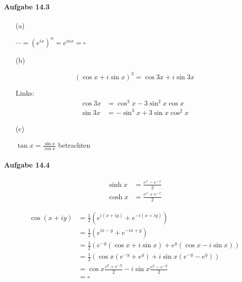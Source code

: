 \paragraph{Aufgabe 14.3}

\begin{enumerate}

\item[(a)]

$\cdots=(e^{ix})^n=e^{inx}=\square$

\item[(b)]

\begin{equation*}
(\cos x+i\sin x)^3=\cos3x+i\sin3x
\end{equation*}

Links:
\begin{align*}
\cos3x&=\cos^3x-3\sin^2x\cos x\\
\sin3x&=-\sin^3x+3\sin x\cos^2x
\end{align*}

\item[(c)]

$\tan x=\frac{\sin x}{\cos x}$ betrachten

\end{enumerate}

\newpage

\paragraph{Aufgabe 14.4}

\begin{enumerate}

\item[]

\begin{align*}
\sinh x&=\frac{e^x-e^{-x}}{2}\\
\cosh x&=\frac{e^x+e^{-x}}{2}
\end{align*}

\begin{align*}
\cos(x+iy)
&=\frac{1}{2}(e^{i(x+iy)}+e^{-i(x+iy)})\\
&=\frac{1}{2}(e^{ix-y}+e^{-ix+y})\\
&=\frac{1}{2}(e^{-y}(\cos x+i\sin x)+e^y(\cos x-i\sin x))\\
&=\frac{1}{2}(\cos x(e^{-y}+e^y)+i\sin x(e^{-y}-e^y))\\
&=\cos x\frac{e^y+e^{-y}}{2}-i\sin x\frac{e^y-e^{-y}}{2}\\
&=\square
\end{align*}

\end{enumerate}